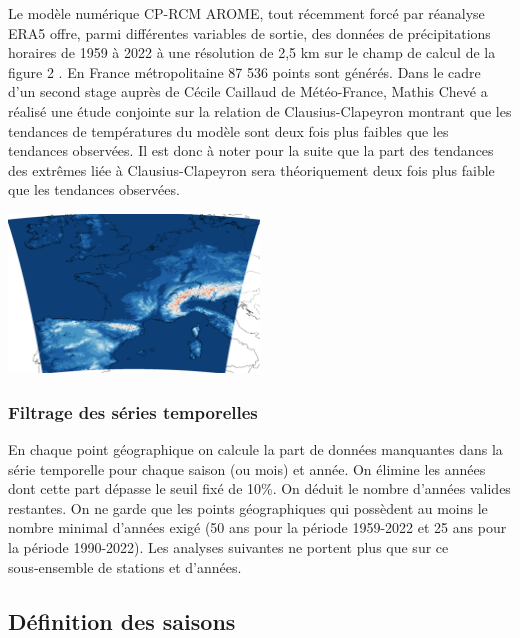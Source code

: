 \documentclass[
  article,
  nofooter,
  noheadings]{jss}
\begin{document}
Le modèle numérique CP-RCM AROME, tout récemment forcé par réanalyse
ERA5 offre, parmi différentes variables de sortie, des données de
précipitations horaires de 1959 à 2022 à une résolution de 2,5 km sur le
champ de calcul de la figure 2 \citep{arome2014}. En France
métropolitaine 87 536 points sont générés. Dans le cadre d'un second
stage auprès de Cécile Caillaud de Météo-France, Mathis Chevé a réalisé
une étude conjointe sur la relation de Clausius-Clapeyron montrant que
les tendances de températures du modèle sont deux fois plus faibles que
les tendances observées. Il est donc à noter pour la suite que la part
des tendances des extrêmes liée à Clausius-Clapeyron sera théoriquement
deux fois plus faible que les tendances observées.

\hfill\break

\begin{center}
  \centering \includegraphics[width=0.5\textwidth]{figures/domaine_calcul_AROME.png}
\end{center}

\hfill\break
{}

\subsubsection{Filtrage des séries
temporelles}\label{filtrage-des-suxe9ries-temporelles}

En chaque point géographique on calcule la part de données manquantes
dans la série temporelle pour chaque saison (ou mois) et année. On
élimine les années dont cette part dépasse le seuil fixé de 10\%. On
déduit le nombre d'années valides restantes. On ne garde que les points
géographiques qui possèdent au moins le nombre minimal d'années exigé
(50 ans pour la période 1959-2022 et 25 ans pour la période 1990-2022).
Les analyses suivantes ne portent plus que sur ce sous‑ensemble de
stations et d'années.

\subsection{Définition des saisons}\label{duxe9finition-des-saisons}
\end{document}
